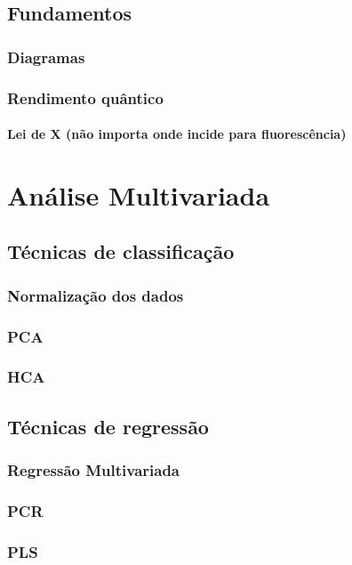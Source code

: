 		\section{Fundamentos}
			\subsection{Diagramas}
			\subsection{Rendimento quântico}
			\subsubsection{Lei de X (não importa onde incide para fluorescência)}
	\chapter{Análise Multivariada}
		\section{Técnicas de classificação}
			\subsection{Normalização dos dados}
			\subsection{PCA}
			\subsection{HCA}
		\section{Técnicas de regressão}
			\subsection{Regressão Multivariada}
			\subsection{PCR}
			\subsection{PLS}